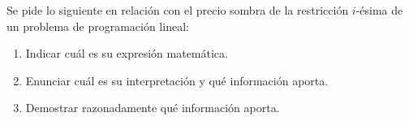 Se pide lo siguiente en relación con el precio sombra de la restricción $i$-ésima de un problema de programación lineal:

\begin{enumerate}[label=\alph*)]
\item Indicar cuál es su expresión matemática.
\item Enunciar cuál es su interpretación y qué información aporta.
\item Demostrar razonadamente qué información aporta.

\end{enumerate}